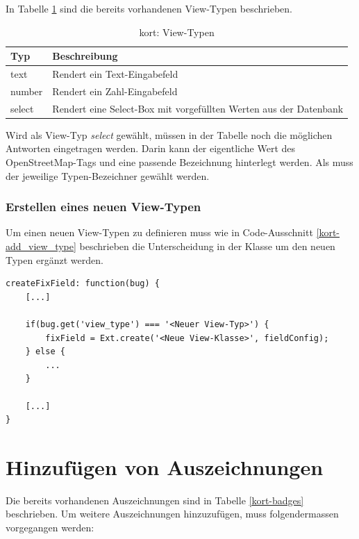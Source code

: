 In Tabelle \ref{kort-view-types-table} sind die bereits vorhandenen View-Typen beschrieben.

\begin{table}[H]
\centering
\begin{tabular}{|p{0.15\twocelltabwidth}|p{0.85\twocelltabwidth}|}
\hline
\textbf{Typ} & \textbf{Beschreibung} \\
\hline
text & Rendert ein Text-Eingabefeld \\
\hline
number & Rendert ein Zahl-Eingabefeld \\
\hline
select & Rendert eine Select-Box mit vorgefüllten Werten aus der Datenbank \\
\hline
\end{tabular}
\caption{kort: View-Typen}
\label{kort-view-types-table}
\end{table}

Wird als View-Typ \emph{select} gewählt, müssen in der Tabelle  noch die möglichen Antworten eingetragen werden.
Darin kann der eigentliche Wert des OpenStreetMap-Tags und eine passende Bezeichnung hinterlegt werden.
Als  muss der jeweilige Typen-Bezeichner gewählt werden.

\subsubsection{Erstellen eines neuen View-Typen}
Um einen neuen View-Typen zu definieren muss wie in Code-Ausschnitt \ref{kort-add_view_type} beschrieben die Unterscheidung in der Klasse  um den neuen Typen ergänzt werden.

\lstset{language=JavaScript}
\begin{lstlisting}[float, caption=Hinzufügen eines View-Typen in der Klasse Kort.view.bugmap.fix.Form, label=kort-add_view_type]
createFixField: function(bug) {
	[...]
	
	if(bug.get('view_type') === '<Neuer View-Typ>') {
		fixField = Ext.create('<Neue View-Klasse>', fieldConfig);
	} else {
		...
	}
	
	[...]
}
\end{lstlisting}

\section{Hinzufügen von Auszeichnungen}
\label{kort-additional-badges}
Die bereits vorhandenen Auszeichnungen sind in Tabelle \ref{kort-badges} beschrieben. Um weitere Auszeichnungen hinzuzufügen, muss folgendermassen vorgegangen werden:

